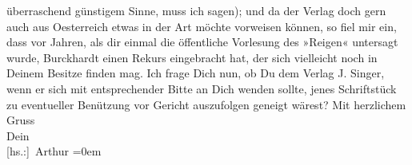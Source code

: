 \begin{ledgroupsized}[t]{13cm}
               überraschend günstigem Sinne, muss ich sagen); und da der Verlag doch gern auch aus
                  Oesterreich etwas in der Art möchte vorweisen
               können, so fiel mir ein, dass vor Jahren, als dir einmal die öffentliche Vorlesung
               des »Reigen« untersagt wurde, Burckhardt einen Rekurs eingebracht hat, der sich vielleicht
               noch in Deinem Besitze finden mag. Ich frage Dich nun, ob Du dem Verlag J. Singer, wenn er sich {\pb}mit entsprechender
               Bitte an Dich wenden sollte, jenes Schriftstück zu eventueller Benützung vor Gericht
               auszufolgen geneigt wärest? \pend
           \pstart
           Mit herzlichem Gruss{\\[\baselineskip]}Dein{\\[\baselineskip]}\spacefill\mbox{{[}hs.:{]} Arthur}\pend
           \leftskip=0em{}          \endnumbering{}\end{ledgroupsized}  \newcommand{\dateiname}{L02181}\newcommand{\titel}{Arthur Schnitzler an Hermann Bahr, 12. 6. 1914}\newcommand{\editorInnen}{ Kurt Ifkovits,  Martin Anton Müller}
            \footnotesize
\begin{ledgroupsized}[t]{11.5cm}
\end{ledgroupsized}
         
      
